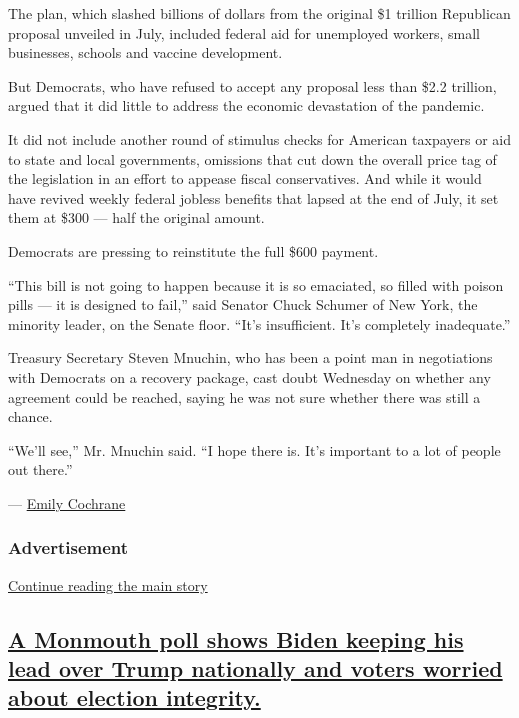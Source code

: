 The plan, which slashed billions of dollars from the original \$1
trillion Republican proposal unveiled in July, included federal aid for
unemployed workers, small businesses, schools and vaccine development.

But Democrats, who have refused to accept any proposal less than \$2.2
trillion, argued that it did little to address the economic devastation
of the pandemic.

It did not include another round of stimulus checks for American
taxpayers or aid to state and local governments, omissions that cut down
the overall price tag of the legislation in an effort to appease fiscal
conservatives. And while it would have revived weekly federal jobless
benefits that lapsed at the end of July, it set them at \$300 --- half
the original amount.

Democrats are pressing to reinstitute the full \$600 payment.

``This bill is not going to happen because it is so emaciated, so filled
with poison pills --- it is designed to fail,'' said Senator Chuck
Schumer of New York, the minority leader, on the Senate floor. ``It's
insufficient. It's completely inadequate.''

Treasury Secretary Steven Mnuchin, who has been a point man in
negotiations with Democrats on a recovery package, cast doubt Wednesday
on whether any agreement could be reached, saying he was not sure
whether there was still a chance.

``We'll see,'' Mr. Mnuchin said. ``I hope there is. It's important to a
lot of people out there.''

--- \href{https://www.nytimes3xbfgragh.onion/by/emily-cochrane}{Emily
Cochrane}

\hypertarget{advertisement-3}{%
\subsubsection{Advertisement}\label{advertisement-3}}

\protect\hyperlink{after-dfp-ad-mid4}{Continue reading the main story}

\hypertarget{a-monmouth-poll-shows-biden-keeping-his-lead-over-trump-nationally-and-voters-worried-about-election-integrity}{%
\subsection{\texorpdfstring{\protect\hyperlink{a-monmouth-poll-shows-biden-keeping-his-lead-over-trump-nationally-and-voters-worried-about-election-integrity}{A
Monmouth poll shows Biden keeping his lead over Trump nationally and
voters worried about election
integrity.}}{A Monmouth poll shows Biden keeping his lead over Trump nationally and voters worried about election integrity.}}\label{a-monmouth-poll-shows-biden-keeping-his-lead-over-trump-nationally-and-voters-worried-about-election-integrity}}

